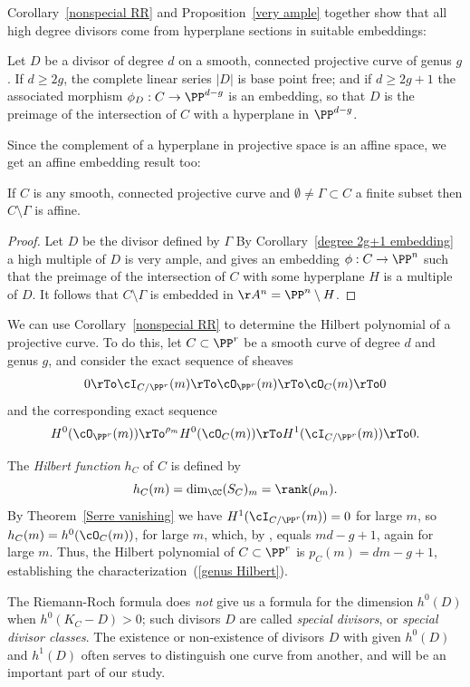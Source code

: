 Corollary~\ref{nonspecial RR} and Proposition~\ref{very ample} together show that all high degree divisors come from hyperplane sections in 
suitable embeddings:

\begin{corollary}\label{degree 2g+1 embedding}
Let $D$ be a divisor of degree $d$ on a smooth, connected projective curve of genus $g$. If $d \geq 2g$, the complete linear series $|D|$ is base point free; and if $d \geq 2g+1$ the associated morphism $\phi_D : C \to \PP^{d-g}$ is an embedding, so that
$D$ is the preimage of the intersection of $C$ with a hyperplane in $ \PP^{d-g}$.
\end{corollary}

Since the complement of a hyperplane in projective space is an affine space, we get an affine embedding result too:

\begin{corollary}
 If $C$ is any smooth, connected projective curve and $\emptyset \neq \Gamma \subset C$ a finite subset then $C \setminus \Gamma$ is affine.
\end{corollary}
\begin{proof}
Let $D$ be the divisor defined by $\Gamma$ By Corollary~\ref{degree 2g+1 embedding} a high multiple of $D$ is very ample,
and gives an embedding $\phi: C\to \PP^n$ such that the preimage of the intersection of $C$ with some hyperplane $H$
is a multiple of $D$. It follows that $C\setminus \Gamma$ is embedded in $\AA^n = \PP^n\setminus H$.
\end{proof}
 
We can  use Corollary~\ref{nonspecial RR} to determine the Hilbert polynomial of a projective curve. To do this, let $C \subset \PP^r$ be a smooth curve of degree $d$ and genus $g$, and consider the exact sequence of sheaves
$$
0 \rTo \cI_{C/\PP^r}(m) \rTo \cO_{\PP^r}(m) \rTo \cO_C(m) \rTo 0
$$
and the corresponding exact sequence
$$
 H^0(\cO_{\PP^r}(m)) \rTo^{\rho_m} H^0(\cO_C(m)) \rTo H^1(\cI_{C/\PP^r}(m)) \rTo 0.
$$

The \emph{Hilbert function} $h_C$ of $C$  is defined by
$$
h_C(m) = \dim_{\CC} (S_{C})_{m} = \rank(\rho_m).
$$
By Theorem~\ref{Serre vanishing} we have $H^1(\cI_{C/\PP^r}(m)) = 0$ for large $m$, so $h_{C}(m) = h^0(\cO_C(m))$, for large $m$, which, by \trr, equals $md-g+1$, again for large $m$. Thus, the Hilbert polynomial of $C \subset \PP^r$ is $p_C(m) = dm-g+1$, establishing the characterization~(\ref{genus Hilbert}).
 
The Riemann-Roch formula does \emph{not} give us a formula for the dimension $h^0(D)$ when $h^0(K_C - D)>0$; such divisors $D$ are called \emph{special divisors}, or \emph{special divisor classes}. The existence or non-existence of divisors $D$ with given $h^{0}(D)$ and $h^{1}(D)$ often serves to distinguish one curve from another, and will be an important part of our study.

